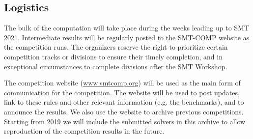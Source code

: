 \documentclass[12pt]{article}
\newcommand{\rem}[1]{\textcolor{red}{[#1]}}
\newcommand{\an}[1]{\rem{#1 -- aina}}
\begin{document}


\subsection{Logistics}
\label{sec:logistics}

%
The bulk of the computation will take place during the weeks leading
up to SMT 2021.  Intermediate results will be regularly posted to the
SMT-COMP website as the competition runs.
%
The organizers reserve the right to prioritize certain competition
tracks or divisions to ensure their timely completion, and in
exceptional circumstances to complete divisions after the SMT
Workshop.


The competition website (\url{www.smtcomp.org}) will be used as the main form
of communication for the competition. The website will be used to post updates,
link to these rules and other relevant information (e.g. the benchmarks), and
to announce the results. We also use the website to archive previous
competitions. Starting from 2019 we will include the submitted solvers in this
archive to allow reproduction of the competition results in the future.
%
\end{document}

